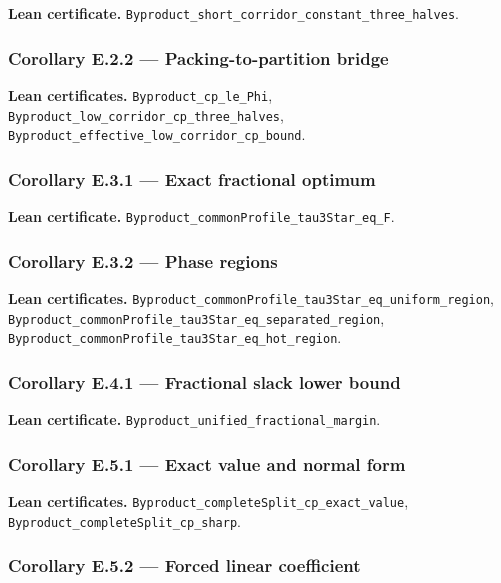 \documentclass[english,11pt,a4paper]{article}
\begin{document}
\textbf{Lean certificate.}
\nolinkurl{Byproduct_short_corridor_constant_three_halves}.

\subsubsection{Corollary E.2.2 --- Packing-to-partition
bridge}\label{corollary-e.2.2-packing-to-partition-bridge}

\textbf{Lean certificates.} \nolinkurl{Byproduct_cp_le_Phi},
\nolinkurl{Byproduct_low_corridor_cp_three_halves},
\nolinkurl{Byproduct_effective_low_corridor_cp_bound}.

\subsubsection{Corollary E.3.1 --- Exact fractional
optimum}\label{corollary-e.3.1-exact-fractional-optimum}

\textbf{Lean certificate.}
\nolinkurl{Byproduct_commonProfile_tau3Star_eq_F}.

\subsubsection{Corollary E.3.2 --- Phase
regions}\label{corollary-e.3.2-phase-regions}

\textbf{Lean certificates.}
\nolinkurl{Byproduct_commonProfile_tau3Star_eq_uniform_region},
\nolinkurl{Byproduct_commonProfile_tau3Star_eq_separated_region},
\nolinkurl{Byproduct_commonProfile_tau3Star_eq_hot_region}.

\subsubsection{Corollary E.4.1 --- Fractional slack lower
bound}\label{corollary-e.4.1-fractional-slack-lower-bound}

\textbf{Lean certificate.}
\nolinkurl{Byproduct_unified_fractional_margin}.

\subsubsection{Corollary E.5.1 --- Exact value and normal
form}\label{corollary-e.5.1-exact-value-and-normal-form}

\textbf{Lean certificates.}
\nolinkurl{Byproduct_completeSplit_cp_exact_value},
\nolinkurl{Byproduct_completeSplit_cp_sharp}.

\subsubsection{Corollary E.5.2 --- Forced linear
coefficient}\label{corollary-e.5.2-forced-linear-coefficient}
\end{document}
